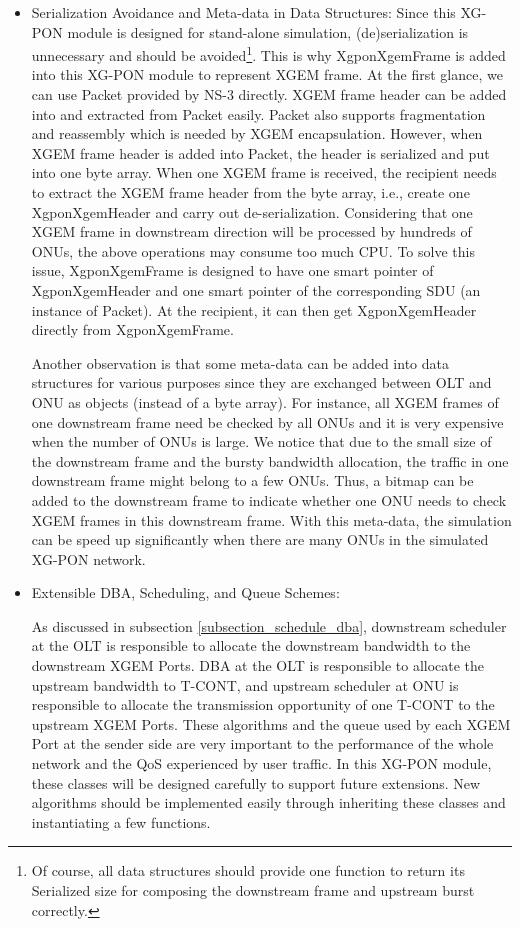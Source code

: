 \begin{itemize}
\item{Serialization Avoidance and Meta-data in Data Structures:}
Since this XG-PON module is designed for stand-alone simulation,
(de)serialization is unnecessary and should be avoided\footnote{Of
course, all data structures should provide one function to return
its Serialized size for composing the downstream frame and
upstream burst correctly.}. This is why XgponXgemFrame is added
into this XG-PON module to represent XGEM frame. At the first
glance, we can use Packet provided by NS-3 directly. XGEM frame
header can be added into and extracted from Packet easily. Packet
also supports fragmentation and reassembly which is needed by XGEM
encapsulation. However, when XGEM frame header is added into
Packet, the header is serialized and put into one byte array. When
one XGEM frame is received, the recipient needs to extract the
XGEM frame header from the byte array, i.e., create one
XgponXgemHeader and carry out de-serialization. Considering that
one XGEM frame in downstream direction will be processed by
hundreds of ONUs, the above operations may consume too much CPU.
To solve this issue, XgponXgemFrame is designed to have one smart
pointer of XgponXgemHeader and one smart pointer of the
corresponding SDU (an instance of Packet). At the recipient, it
can then get XgponXgemHeader directly from XgponXgemFrame.


Another observation is that some meta-data can be added into data
structures for various purposes since they are exchanged between
OLT and ONU as objects (instead of a byte array). For instance,
all XGEM frames of one downstream frame need be checked by all
ONUs and it is very expensive when the number of ONUs is large. We
notice that due to the small size of the downstream frame and the
bursty bandwidth allocation, the traffic in one downstream frame
might belong to a few ONUs. Thus, a bitmap can be added to the
downstream frame to indicate whether one ONU needs to check XGEM
frames in this downstream frame. With this meta-data, the
simulation can be speed up significantly when there are many ONUs
in the simulated XG-PON network.



\item{Extensible DBA, Scheduling, and Queue Schemes:}

As discussed in subsection \ref{subsection_schedule_dba},
downstream scheduler at the OLT is responsible to allocate the
downstream bandwidth to the downstream XGEM Ports. DBA at the OLT
is responsible to allocate the upstream bandwidth to T-CONT, and
upstream scheduler at ONU is responsible to allocate the
transmission opportunity of one T-CONT to the upstream XGEM Ports.
These algorithms and the queue used by each XGEM Port at the
sender side are very important to the performance of the whole
network and the QoS experienced by user traffic.  In this XG-PON
module, these classes will be designed carefully to support future
extensions. New algorithms should be implemented easily through
inheriting these classes and instantiating a few functions.


\end{itemize}

